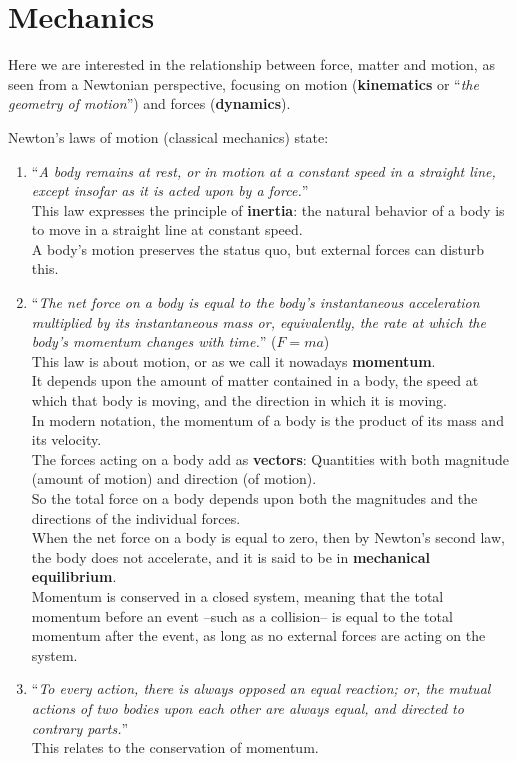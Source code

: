 \section{Mechanics}\label{sec:mechanics}

Here we are interested in the relationship between force, matter and motion, as seen from a Newtonian perspective, focusing on motion (\textbf{kinematics} or ``\textit{the geometry of motion}'') and forces (\textbf{dynamics}).

Newton's laws of motion (classical mechanics) state:

\begin{enumerate}
    \item ``\textit{A body remains at rest, or in motion at a constant speed in a straight line, except insofar as it is acted upon by a force.}'' \\
    This law expresses the principle of \textbf{\gls{inertia}}: the natural behavior of a body is to move in a straight line at constant speed. \\
    A body's motion preserves the status quo, but external forces can disturb this.
    \item ``\textit{The net force on a body is equal to the body's instantaneous acceleration multiplied by its instantaneous mass or, equivalently, the rate at which the body's momentum changes with time.}'' ($F = ma$) \\
    This law is about motion, or as we call it nowadays \textbf{\gls{momentum}}. \\
    It depends upon the amount of matter contained in a body, the speed at which that body is moving, and the direction in which it is moving. \\
    In modern notation, the momentum of a body is the product of its mass and its velocity. \\
    The forces acting on a body add as \textbf{\gls{vector}s}: Quantities with both magnitude (amount of motion) and direction (of motion). \\
    So the total force on a body depends upon both the magnitudes and the directions of the individual forces. \\
    When the net force on a body is equal to zero, then by Newton's second law, the body does not accelerate, and it is said to be in \textbf{mechanical equilibrium}. \\
    Momentum is conserved in a closed system, meaning that the total momentum before an event --such as a collision-- is equal to the total momentum after the event, as long as no external forces are acting on the system.
    \item ``\textit{To every action, there is always opposed an equal reaction; or, the mutual actions of two bodies upon each other are always equal, and directed to contrary parts.}'' \\
    This relates to the conservation of momentum.
\end{enumerate}


